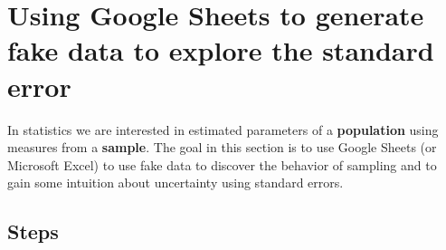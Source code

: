 \documentclass[]{book}
\begin{document}
\hypertarget{using-google-sheets-to-generate-fake-data-to-explore-the-standard-error}{%
\section{Using Google Sheets to generate fake data to explore the standard error}\label{using-google-sheets-to-generate-fake-data-to-explore-the-standard-error}}

In statistics we are interested in estimated parameters of a \textbf{population} using measures from a \textbf{sample}. The goal in this section is to use Google Sheets (or Microsoft Excel) to use fake data to discover the behavior of sampling and to gain some intuition about uncertainty using standard errors.

\hypertarget{steps}{%
\subsection{Steps}\label{steps}}
\end{document}
